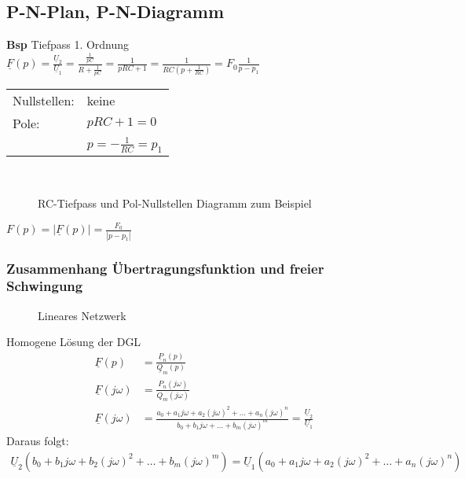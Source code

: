 \subsection{P-N-Plan, P-N-Diagramm}
\textbf{Bsp} Tiefpass 1. Ordnung\\
$\underline{F}(p)=\frac{\underline{U}_2}{\underline{U}_1}=\frac{\frac{1}{pC}}{R+\frac{1}{pC}}=\frac{1}{pRC+1}
=\frac{1}{RC\left(p+\frac{1}{RC}\right)}=F_0\frac{1}{p-p_1}$\\
\begin{tabular}{ll}
Nullstellen: & keine\\
Pole: & $pRC+1=0$ \\
& $p=-\frac{1}{RC}=p_1$\\
\end{tabular}\\
\begin{figure}[htp]
\centering
  \subfloat[RC-Tiefpass]{
    
    \label{fig:ElNetzw:Bsp1:RCTiefpass}
  }
  \qquad
  \caption[RC-Tiefpass und Pol-Nullstellen Diagramm]{RC-Tiefpass und
  Pol-Nullstellen Diagramm zum Beispiel}
  \label{fig:ElNetzw:PolNullstellenDiag}
\end{figure}
$F(p)=|\underline{F}(p)|=\frac{F_0}{|p-p_1|}$\\

\subsubsection{Zusammenhang Übertragungsfunktion und freier Schwingung}
\begin{figure}[htp]
\begin{center}
  
  \caption[Lineares Netzwerk]{Lineares Netzwerk}
  \label{fig:ElNetzw:LinNetzwerk}
\end{center}
\end{figure}
Homogene Lösung der DGL
\begin{align}
	\underline{F}(p)&=\frac{\underline{P}_n(p)}{\underline{Q}_m(p)}\nonumber\\
	\underline{F}(j\omega)&=\frac{P_n(j\omega)}{Q_m(j\omega)}\nonumber\\
	\underline{F}(j\omega)&=\frac{a_0+a_1j\omega+a_2(j\omega)^2+\ldots+a_n(j\omega)^n}{b_0+b_1j\omega+\ldots+b_m(j\omega)^m}=\frac{\underline{U}_2}{\underline{U}_1}\nonumber
\end{align}
Daraus folgt:
\begin{align}
\underline{U}_2(b_0+b_1j\omega+b_2(j\omega)^2+\ldots+b_m(j\omega)^m)=\underline{U}_1(a_0+a_1j\omega+a_2(j\omega)^2+\ldots+a_n(j\omega)^n)\nonumber
\end{align}


